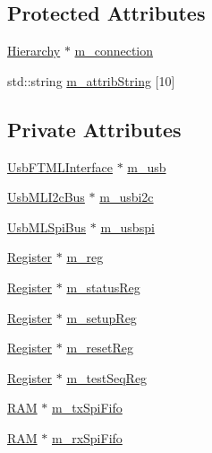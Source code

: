 \subsection*{Protected Attributes}
\begin{DoxyCompactItemize}
\item 
\hyperlink{classHierarchy}{Hierarchy} $\ast$ \hyperlink{classElement_abe3de7a5dbbc9a6dd2d7e012e5fdb266}{m\+\_\+connection}
\item 
std\+::string \hyperlink{classAttrib_a3414521d7a82476e874b25a5407b5e63}{m\+\_\+attrib\+String} \mbox{[}10\mbox{]}
\end{DoxyCompactItemize}
\subsection*{Private Attributes}
\begin{DoxyCompactItemize}
\item 
\hyperlink{classUsbFTMLInterface}{Usb\+F\+T\+M\+L\+Interface} $\ast$ \hyperlink{classSeqPGA_a3df81bbe0e75a1287aa6fe9d33ea27f5}{m\+\_\+usb}
\item 
\hyperlink{classUsbMLI2cBus}{Usb\+M\+L\+I2c\+Bus} $\ast$ \hyperlink{classSeqPGA_a31d692cdc2f70dfd71671f3e2d688e20}{m\+\_\+usbi2c}
\item 
\hyperlink{classUsbMLSpiBus}{Usb\+M\+L\+Spi\+Bus} $\ast$ \hyperlink{classSeqPGA_aeb7d559e042bced959366125781cef39}{m\+\_\+usbspi}
\item 
\hyperlink{classRegister}{Register} $\ast$ \hyperlink{classSeqPGA_afd827f1d3d55b0a8efafbd79a8c54a52}{m\+\_\+reg}
\item 
\hyperlink{classRegister}{Register} $\ast$ \hyperlink{classSeqPGA_ae39eb15fbde7a4a48376c8cbdbbceeaa}{m\+\_\+status\+Reg}
\item 
\hyperlink{classRegister}{Register} $\ast$ \hyperlink{classSeqPGA_a03269241e7fc26493cd0595beda334c2}{m\+\_\+setup\+Reg}
\item 
\hyperlink{classRegister}{Register} $\ast$ \hyperlink{classSeqPGA_a8c519e98b992ab872622e95dae4461d8}{m\+\_\+reset\+Reg}
\item 
\hyperlink{classRegister}{Register} $\ast$ \hyperlink{classSeqPGA_a7478537516c951a4d08f23b0789ed6d9}{m\+\_\+test\+Seq\+Reg}
\item 
\hyperlink{classRAM}{R\+AM} $\ast$ \hyperlink{classSeqPGA_a6fbdd81928bb5d0fcd671ae2facaef11}{m\+\_\+tx\+Spi\+Fifo}
\item 
\hyperlink{classRAM}{R\+AM} $\ast$ \hyperlink{classSeqPGA_a8ebfe7863e10ab540b5ebecb7655a0d5}{m\+\_\+rx\+Spi\+Fifo}

\end{DoxyCompactItemize}
